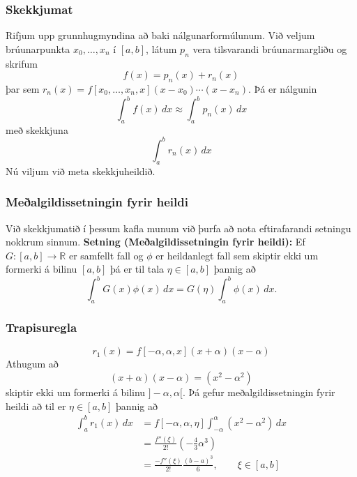 \documentclass[icelandic,a4paper,12pt]{article}
\newcommand{\R}{{\mathbb  R}}
\begin{document}
\subsubsection{Skekkjumat}
Rifjum upp grunnhugmyndina að baki nálgunarformúlunum. Við veljum
brúunarpunkta $x_0, \ldots, x_n$ í $[a,b]$, látum $p_n$ vera
tilsvarandi brúunarmargliðu og skrifum 
\begin{equation*}
  f(x) = p_n(x) + r_n(x)
\end{equation*}
\pause
þar sem $r_n(x) = f[x_0, \ldots , x_n, x](x-x_0) \cdots (x-x_n)$. Þá er nálgunin
\begin{equation*}
  \int_a^b f(x)\,dx \approx \int_a^b p_n(x)\,dx
\end{equation*}
\pause
með skekkjuna
\begin{equation*}
  \int_a^b r_n(x)\,dx
\end{equation*}
Nú viljum við meta skekkjuheildið.


\subsubsection{Meðalgildissetningin fyrir heildi}
 Við skekkjumatið í þessum kafla munum við þurfa að nota eftirafarandi 
 setningu nokkrum sinnum.
\textbf{Setning (Meðalgildissetningin fyrir heildi):}
 Ef $G:[a,b] \to \R$ er samfellt fall og $\phi$ er heildanlegt fall sem 
 skiptir ekki um formerki á bilinu $[a,b]$ þá er til tala $\eta \in [a,b]$
 þannig að 
 $$
  \int_a^b G(x)\phi(x)\, dx = G(\eta) \int_a^b \phi(x)\, dx.
 $$





\subsubsection{Trapisuregla} 
\begin{equation*}
  r_1(x) = f[-\alpha, \alpha, x](x+\alpha)(x-\alpha)
\end{equation*}
\pause
Athugum að 
\begin{equation*}
  (x+\alpha)(x-\alpha) = (x^2 - \alpha^2)
\end{equation*}
skiptir ekki um formerki á bilinu $]-\alpha, \alpha[$. \pause
Þá gefur meðalgildissetningin fyrir heildi að til 
er $\eta \in [a,b]$ þannig að\pause
\begin{align*}
  \int_a^b r_1(x)\,dx 
  &= f[-\alpha, \alpha, \eta]
  \int_{-\alpha}^{\alpha}(x^2 - \alpha^2)\,dx\\
  &= \frac{f''(\xi)}{2!} \left( - \frac{4}{3}\alpha^3 \right)\\
  &= \frac{-f''(\xi)}{2!}\frac{(b-a)^3}{6}, \qquad \xi \in [a,b]
\end{align*}
\end{document}
